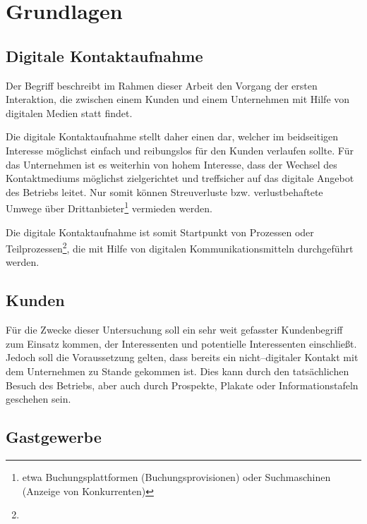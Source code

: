 \section{Grundlagen}
\label{sec:grundlagen}

\subsection{Digitale Kontaktaufnahme}

Der Begriff  beschreibt im Rahmen dieser Arbeit den Vorgang der ersten Interaktion, die zwischen einem Kunden und einem Unternehmen mit Hilfe von digitalen Medien statt findet. 

Die digitale Kontaktaufnahme stellt daher einen  dar, welcher im beidseitigen Interesse möglichst einfach und reibungslos für den Kunden verlaufen sollte. Für das Unternehmen ist es weiterhin von hohem Interesse, dass der Wechsel des Kontaktmediums möglichst zielgerichtet und treffsicher auf das digitale Angebot des Betriebs leitet. Nur somit können Streuverluste bzw. verlustbehaftete Umwege über Drittanbieter\footnote{etwa Buchungsplattformen (Buchungsprovisionen) oder Suchmaschinen (Anzeige von Konkurrenten)} vermieden werden.

Die digitale Kontaktaufnahme ist somit Startpunkt von Prozessen oder Teilprozessen\footnote{}, die mit Hilfe von digitalen Kommunikationsmitteln durchgeführt werden.

\subsection{Kunden}

Für die Zwecke dieser Untersuchung soll ein sehr weit gefasster Kundenbegriff zum Einsatz kommen, der Interessenten und potentielle Interessenten einschließt. Jedoch soll die Voraussetzung gelten, dass bereits ein nicht--digitaler Kontakt mit dem Unternehmen zu Stande gekommen ist. Dies kann durch den tatsächlichen Besuch des Betriebs, aber auch durch Prospekte, Plakate oder Informationstafeln geschehen sein.

\subsection{Gastgewerbe}




